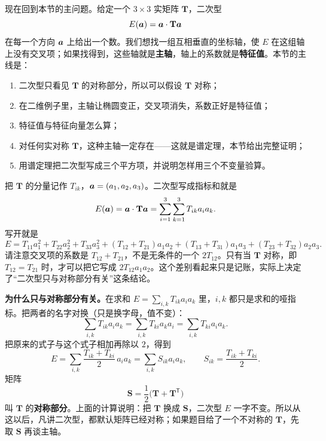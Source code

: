 \documentclass[11pt]{ctexart}
\newcommand{\ten}[1]{\mathbf{#1}}
\let\orighdr\hdr
\renewcommand{\hdr}[2]{\par\needspace{10\baselineskip}\orighdr{#1}{#2}}
\let\origsubhdr\subhdr
\renewcommand{\subhdr}[1]{\par\needspace{3\baselineskip}\origsubhdr{#1}}
\begin{document}
\begin{center}
\end{center}

\label{sec:quadratic}

现在回到本节的主问题。给定一个 $3\times3$ 实矩阵 $\ten T$，二次型
\[
E(\vect a)=\vect a\cdot\ten T\vect a
\]
在每一个方向 $\boldsymbol{a}$ 上给出一个数。我们想找一组互相垂直的坐标轴，使 $E$ 在这组轴上没有交叉项；如果找得到，这些轴就是\textbf{主轴}，轴上的系数就是\textbf{特征值}。本节的主线是：
\begin{enumerate}[label=\arabic*.,leftmargin=1.8em,itemsep=2pt]
\item 二次型只看见 $\ten T$ 的对称部分，所以可以假设 $\ten T$ 对称；
\item 在二维例子里，主轴让椭圆变正，交叉项消失，系数正好是特征值；
\item 特征值与特征向量怎么算；
\item 对任何实对称 $\ten T$，这种主轴一定存在——这就是谱定理，本节给出完整证明；
\item 用谱定理把二次型写成三个平方项，并说明怎样用三个不变量验算。
\end{enumerate}

\label{subsec:quadratic-sym}

把 $\ten T$ 的分量记作 $T_{ik}$，$\boldsymbol{a}=(a_1,a_2,a_3)$。二次型写成指标和就是
\[
E(\vect a)=\vect a\cdot\ten T\vect a
=\sum_{i=1}^{3}\sum_{k=1}^{3}T_{ik}a_ia_k .
\]
写开就是
\[
E=T_{11}a_1^2+T_{22}a_2^2+T_{33}a_3^2
+(T_{12}+T_{21})a_1a_2
+(T_{13}+T_{31})a_1a_3
+(T_{23}+T_{32})a_2a_3 .
\]
请注意交叉项的系数是 $T_{12}+T_{21}$，不是无条件的一个 $2T_{12}$。只有当 $\ten T$ 对称，即 $T_{12}=T_{21}$ 时，才可以把它写成 $2T_{12}a_1a_2$。这个差别看起来只是记账，实际上决定了“二次型只与对称部分有关”这条结论。

\textbf{为什么只与对称部分有关。}在求和 $E=\sum_{i,k}T_{ik}a_ia_k$ 里，$i,k$ 都只是求和的哑指标。把两者的名字对换（只是换字母，值不变）：
\[
\sum_{i,k}T_{ik}a_ia_k
=\sum_{i,k}T_{ki}a_ka_i
=\sum_{i,k}T_{ki}a_ia_k .
\]
把原来的式子与这个式子相加再除以 $2$，得到
\[
E=\sum_{i,k}\frac{T_{ik}+T_{ki}}{2}\,a_ia_k
=\sum_{i,k}S_{ik}a_ia_k,
\qquad
S_{ik}=\frac{T_{ik}+T_{ki}}{2}.
\]
矩阵
\[
\ten S=\frac12\bigl(\ten T+\ten T^{\mathsf T}\bigr)
\]
叫 $\ten T$ 的\textbf{对称部分}。上面的计算说明：把 $\ten T$ 换成 $\ten S$，二次型 $E$ 一字不变。所以从这以后，凡讲二次型，都默认矩阵已经对称；如果题目给了一个不对称的 $\ten T$，先取 $\ten S$ 再谈主轴。
\end{document}
